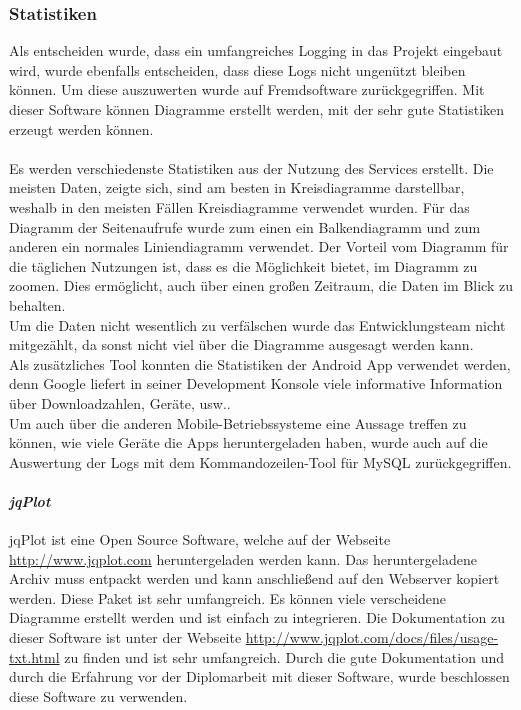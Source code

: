 \subsubsection{Statistiken}
%
Als entscheiden wurde, dass ein umfangreiches Logging in das Projekt eingebaut wird, wurde ebenfalls entscheiden, dass diese Logs nicht ungenützt bleiben können. Um diese auszuwerten wurde auf Fremdsoftware zurückgegriffen. Mit dieser Software können Diagramme erstellt werden, mit der sehr gute Statistiken erzeugt werden können.\\
\\
Es werden verschiedenste Statistiken aus der Nutzung des Services erstellt. Die meisten Daten, zeigte sich, sind am besten in Kreisdiagramme darstellbar, weshalb in den meisten Fällen Kreisdiagramme verwendet wurden. Für das Diagramm der Seitenaufrufe wurde zum einen ein Balkendiagramm und zum anderen ein normales Liniendiagramm verwendet. Der Vorteil vom Diagramm für die täglichen Nutzungen ist, dass es die Möglichkeit bietet, im Diagramm zu zoomen. Dies ermöglicht, auch über einen großen Zeitraum, die Daten im Blick zu behalten.\\
Um die Daten nicht wesentlich zu verfälschen wurde das Entwicklungsteam nicht mitgezählt, da sonst nicht viel über die Diagramme ausgesagt werden kann.\\
Als zusätzliches Tool konnten die Statistiken der Android App verwendet werden, denn Google liefert in seiner Development Konsole viele informative Information über Downloadzahlen, Geräte, usw..\\
Um auch über die anderen Mobile-Betriebssysteme eine Aussage treffen zu können, wie viele Geräte die Apps heruntergeladen haben, wurde auch auf die Auswertung der Logs mit dem Kommandozeilen-Tool für MySQL zurückgegriffen.
\paragraph{\textit{jqPlot}\\}
jqPlot ist eine Open Source Software, welche auf der Webseite \url{http://www.jqplot.com} heruntergeladen werden kann. Das heruntergeladene Archiv muss entpackt werden und kann anschließend auf den Webserver kopiert werden. Diese Paket ist sehr umfangreich. Es können viele verscheidene Diagramme erstellt werden und ist einfach zu integrieren. Die Dokumentation zu dieser Software ist unter der Webseite \url{http://www.jqplot.com/docs/files/usage-txt.html} zu finden und ist sehr umfangreich. Durch die gute Dokumentation und durch die Erfahrung vor der Diplomarbeit mit dieser Software, wurde beschlossen diese Software zu verwenden.
